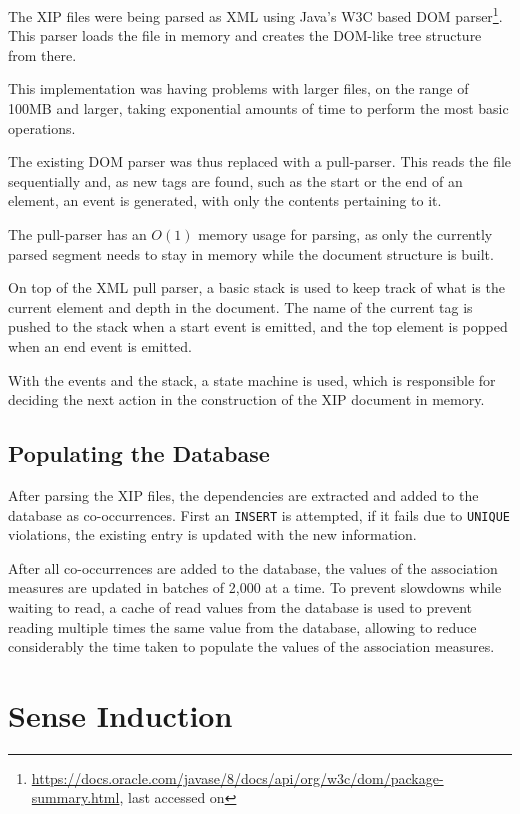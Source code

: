 The \ac{XIP} files were being parsed as XML using Java's W3C based \ac{DOM}
parser\footnote{\url{https://docs.oracle.com/javase/8/docs/api/org/w3c/dom/package-summary.html},
last accessed on }. This parser loads the file in memory and
creates the \ac{DOM}-like tree structure from there.

This implementation was having problems with larger files, on the range of
100MB and larger, taking exponential amounts of time to perform the most basic
operations.

The existing \ac{DOM} parser was thus replaced with a pull-parser. This reads
the file sequentially and, as new tags are found, such as the start or the
end of an element, an event is generated, with only the contents pertaining to 
it.

The pull-parser has an $O(1)$ memory usage for parsing, as only the currently
parsed segment needs to stay in memory while the document structure is built.

On top of the XML pull parser, a basic stack is used to keep track of what is
the current element and depth in the document. The name of the current tag
is pushed to the stack when a start event is emitted, and the top element is
popped when an end event is emitted.

With the events and the stack, a state machine is used, which is responsible for
deciding the next action in the construction of the XIP document in memory.

\subsection{Populating the Database}

After parsing the \ac{XIP} files, the dependencies are extracted and added to 
the database as co-occurrences. First an \texttt{INSERT} is attempted, if it 
fails due to \texttt{UNIQUE} violations, the existing entry is updated with the 
new information.

After all co-occurrences are added to the database, the values of the
association measures are updated in batches of 2,000 at a time. To prevent
slowdowns while waiting to read, a cache of read values from the database is
used to prevent reading multiple times the same value from the database,
allowing to reduce considerably the time taken to populate the values of the 
association measures.

\section{Sense Induction}

